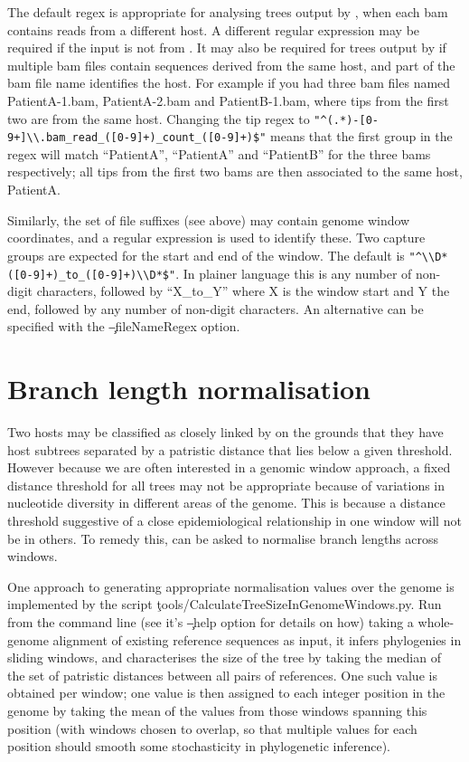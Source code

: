 The default regex is appropriate for analysing trees output by \pmt, when each bam contains reads from a different host.
A different regular expression may be required if the input is not from \pmt.
It may also be required for trees output by \pmt if multiple bam files contain sequences derived from the same host, and part of the bam file name identifies the host.
For example if you had three bam files named \mbox{PatientA-1.bam}, PatientA-2.bam and PatientB-1.bam, where tips from the first two are from the same host.
Changing the tip regex to \verb|"^(.*)-[0-9+]\\.bam_read_([0-9]+)_count_([0-9]+)$"| means that the first group in the regex will match ``PatientA'', ``PatientA'' and ``PatientB'' for the three bams respectively; all tips from the first two bams are then associated to the same host, PatientA.

Similarly, the set of file suffixes (see above) may contain genome window coordinates, and a regular expression is used to identify these.
Two capture groups are expected for the start and end of the window.
The default is \verb|"^\\D*([0-9]+)_to_([0-9]+)\\D*$"|.
In plainer language this is any number of non-digit characters, followed by ``X\_to\_Y'' where X is the window start and Y the end, followed by any number of non-digit characters.
An alternative can be specified with the \c{--fileNameRegex} option.

\section{Branch length normalisation} \label{sec:normalisation}

Two hosts may be classified as closely linked by \pat on the grounds that they have host subtrees separated by a patristic distance that lies below a given threshold.
However because we are often interested in a genomic window approach, a fixed distance threshold for all trees may not be appropriate because of variations in nucleotide diversity in different areas of the genome.
This is because a distance threshold suggestive of a close epidemiological relationship in one window will not be in others.
To remedy this, \pat can be asked to normalise branch lengths across windows.

One approach to generating appropriate normalisation values over the genome is implemented by the script \c{tools/CalculateTreeSizeInGenomeWindows.py}.
Run from the command line (see it's \c{--help} option for details on how) taking a whole-genome alignment of existing reference sequences as input, it infers phylogenies in sliding windows, and characterises the size of the tree by taking the median of the set of patristic distances between all pairs of references.
One such value is obtained per window; one value is then assigned to each integer position in the genome by taking the mean of the values from those windows spanning this position (with windows chosen to overlap, so that multiple values for each position should smooth some stochasticity in phylogenetic inference).

